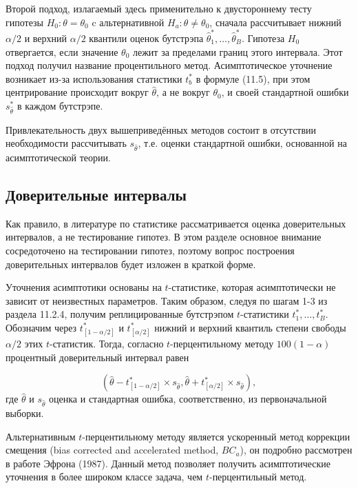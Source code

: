 Второй подход, излагаемый здесь применительно к  двустороннему тесту гипотезы $H_0:\theta=\theta_0$ c альтернативной $H_a:\theta \neq \theta_0$, сначала рассчитывает нижний $\alpha/2$ и верхний $\alpha/2$ квантили оценок бутстрэпа $\hat{\theta}_1^*,\ldots ,\hat{\theta}_B^*$. Гипотеза $H_0$ отвергается, если значение $\theta_0$ лежит за пределами границ этого интервала. Этот подход получил название процентильного метод. Асимптотическое уточнение  возникает из-за использования  статистики $t_b^*$ в формуле (11.5), при этом центрирование происходит вокруг  $\hat{\theta}$, а не вокруг $\theta_0$, и своей стандартной ошибки $s_{\hat{\theta}}^*$ в каждом бутстрэпе.

Привлекательность двух вышеприведённых методов состоит в отсутствии необходимости рассчитывать $s_{\hat{\theta}}$, т.е. оценки стандартной ошибки, основанной на асимптотической теории.

\subsection{Доверительные интервалы}

Как правило, в литературе по статистике рассматривается оценка доверительных интервалов, а не тестирование гипотез. В этом разделе основное внимание сосредоточено на тестировании гипотез, поэтому вопрос построения доверительных интервалов будет изложен в краткой форме. 

Уточнения асимптотики основаны на $t$-статистике, которая асимптотически не зависит от неизвестных параметров. Таким образом, следуя по шагам 1-3 из раздела 11.2.4, получим реплицированные бутстрэпом $t$-статистики $t_1^*,\ldots ,t_B^*$. Обозначим через $t_{[1-\alpha/2]}^*$ и $t_{[\alpha/2]}^*$ нижний и верхний квантиль степени свободы $\alpha/2$ этих $t$-статистик. Тогда, согласно $t$-перцентильному методу $100(1-\alpha)$ процентный доверительный интервал равен

\begin{equation}
(\hat{\theta}-t_{[1-\alpha/2]}^*{\times}s_{\hat{\theta}},\hat{\theta}+t_{[\alpha/2]}^*{\times}s_{\hat{\theta}}),
\end{equation}
где $\hat{\theta}$ и $s_{\hat{\theta}}$ оценка и стандартная ошибка, соответственно, из первоначальной выборки.

Альтернативным $t$-перцентильному методу  является ускоренный метод коррекции смещения (bias corrected and accelerated method, $BC_a$), он подробно рассмотрен в работе Эфрона (1987). Данный метод позволяет получить асимптотические уточнения в более широком классе задача, чем $t$-перцентильный метод.

